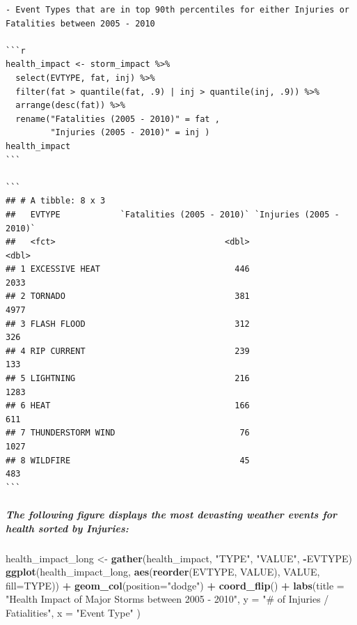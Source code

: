 \documentclass[]{article}
\newenvironment{Shaded}{\begin{snugshade}}{\end{snugshade}}
\newcommand{\DataTypeTok}[1]{\textcolor[rgb]{0.13,0.29,0.53}{#1}}
\newcommand{\KeywordTok}[1]{\textcolor[rgb]{0.13,0.29,0.53}{\textbf{#1}}}
\newcommand{\NormalTok}[1]{#1}
\newcommand{\OperatorTok}[1]{\textcolor[rgb]{0.81,0.36,0.00}{\textbf{#1}}}
\newcommand{\StringTok}[1]{\textcolor[rgb]{0.31,0.60,0.02}{#1}}
\let\oldsubparagraph\subparagraph
\renewcommand{\subparagraph}[1]{\oldsubparagraph{#1}\mbox{}}
\begin{document}
\begin{verbatim}
- Event Types that are in top 90th percentiles for either Injuries or Fatalities between 2005 - 2010

```r
health_impact <- storm_impact %>%
  select(EVTYPE, fat, inj) %>%
  filter(fat > quantile(fat, .9) | inj > quantile(inj, .9)) %>%
  arrange(desc(fat)) %>%
  rename("Fatalities (2005 - 2010)" = fat ,
         "Injuries (2005 - 2010)" = inj )
health_impact
```

```
## # A tibble: 8 x 3
##   EVTYPE            `Fatalities (2005 - 2010)` `Injuries (2005 - 2010)`
##   <fct>                                  <dbl>                    <dbl>
## 1 EXCESSIVE HEAT                           446                     2033
## 2 TORNADO                                  381                     4977
## 3 FLASH FLOOD                              312                      326
## 4 RIP CURRENT                              239                      133
## 5 LIGHTNING                                216                     1283
## 6 HEAT                                     166                      611
## 7 THUNDERSTORM WIND                         76                     1027
## 8 WILDFIRE                                  45                      483
```
\end{verbatim}

\hypertarget{the-following-figure-displays-the-most-devasting-weather-events-for-health-sorted-by-injuries}{%
\subparagraph{The following figure displays the most devasting weather
events for health sorted by
Injuries:}\label{the-following-figure-displays-the-most-devasting-weather-events-for-health-sorted-by-injuries}}

\begin{Shaded}
\begin{Highlighting}[]
\NormalTok{health_impact_long <-}\StringTok{ }\KeywordTok{gather}\NormalTok{(health_impact, }\StringTok{"TYPE"}\NormalTok{, }\StringTok{"VALUE"}\NormalTok{, }\OperatorTok{-}\NormalTok{EVTYPE)}
\KeywordTok{ggplot}\NormalTok{(health_impact_long, }\KeywordTok{aes}\NormalTok{(}\KeywordTok{reorder}\NormalTok{(EVTYPE, VALUE), VALUE, }\DataTypeTok{fill=}\NormalTok{TYPE)) }\OperatorTok{+}
\StringTok{  }\KeywordTok{geom_col}\NormalTok{(}\DataTypeTok{position=}\StringTok{"dodge"}\NormalTok{) }\OperatorTok{+}
\StringTok{  }\KeywordTok{coord_flip}\NormalTok{() }\OperatorTok{+}
\StringTok{  }\KeywordTok{labs}\NormalTok{(}\DataTypeTok{title =} \StringTok{"Health Impact of Major Storms between 2005 - 2010"}\NormalTok{,}
        \DataTypeTok{y =} \StringTok{"# of Injuries / Fatialities"}\NormalTok{,}
        \DataTypeTok{x =} \StringTok{"Event Type"}
\NormalTok{        )}
\end{Highlighting}
\end{Shaded}
\end{document}
